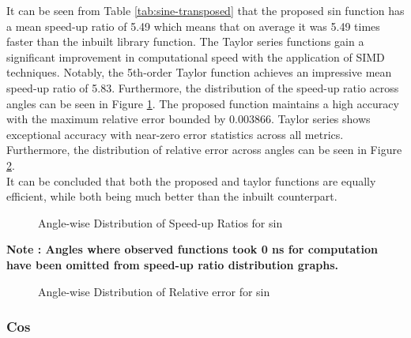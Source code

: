 \documentclass[12pt,twoside, letterpaper, margin=1in]{article}
\begin{document}
It can be seen from Table \ref{tab:sine-transposed} that the proposed sin function has a mean speed-up ratio of 5.49 which means that on average it was 5.49 times faster than the inbuilt library function. The Taylor series functions gain a significant improvement in computational speed with the application of SIMD techniques. Notably, the 5th-order Taylor function achieves an impressive mean speed-up ratio of 5.83. Furthermore, the distribution of the speed-up ratio across angles can be seen in Figure \ref{speed_up_ratio_sin}. 
The proposed function maintains a high accuracy with the maximum relative error bounded by 0.003866. Taylor series shows exceptional accuracy with near-zero error statistics across all metrics. Furthermore, the distribution of relative error across angles can be seen in Figure \ref{rel_error_sin}.\\
It can be concluded that both the proposed and taylor functions are equally efficient, while both being much better than the inbuilt counterpart.
\begin{figure}[H]
    \centering
    \hfill
    \caption{Angle-wise Distribution of Speed-up Ratios for sin}
    \label{speed_up_ratio_sin}
\end{figure}

{\small\textbf{Note : Angles where observed functions took 0 ns for computation have been omitted from speed-up ratio distribution graphs.}}

\begin{figure}[H]
    \centering
    \hfill
    \caption{Angle-wise Distribution of Relative error for sin}
    \label{rel_error_sin}
\end{figure}

\subsubsection{Cos}
\end{document}

